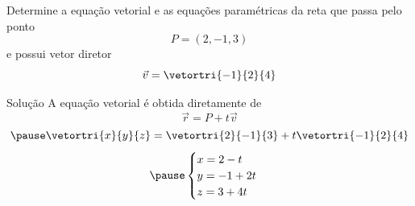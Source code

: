\begin{question}
  Determine a equação vetorial e as equações paramétricas da reta que passa pelo ponto
  \[
    P = (2, -1, 3)
  \]
  e possui vetor diretor
  \[
    \vec{v} = \vetortri{-1}{2}{4}
  \]
\end{question}

\begin{resolution}{Solução}
  A equação vetorial é obtida diretamente de
  \[
    \vec{r} = P + t\vec{v}
  \]
  \[
    \pause
    \vetortri{x}{y}{z} = \vetortri{2}{-1}{3} + t \vetortri{-1}{2}{4}
  \]
  \[
    \pause
    \begin{cases}
      x =  2 -  t \\
      y = -1 + 2t \\
      z =  3 + 4t
    \end{cases}
  \]
\end{resolution}

\endinput
